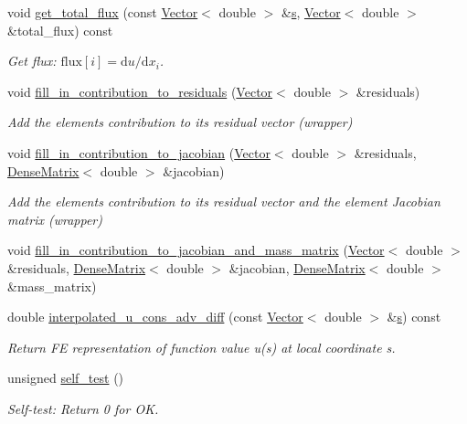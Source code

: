 \begin{DoxyCompactItemize}
void \hyperlink{classoomph_1_1GeneralisedAdvectionDiffusionEquations_a79bce0d40bdc46e998729332ceefb889}{get\+\_\+total\+\_\+flux} (const \hyperlink{classoomph_1_1Vector}{Vector}$<$ double $>$ \&\hyperlink{cfortran_8h_ab7123126e4885ef647dd9c6e3807a21c}{s}, \hyperlink{classoomph_1_1Vector}{Vector}$<$ double $>$ \&total\+\_\+flux) const
\begin{DoxyCompactList}\small\item\em Get flux\+: $\mbox{flux}[i] = \mbox{d}u / \mbox{d}x_i $. \end{DoxyCompactList}\item 
void \hyperlink{classoomph_1_1GeneralisedAdvectionDiffusionEquations_a322c49659ad14f656165f7e777d3368a}{fill\+\_\+in\+\_\+contribution\+\_\+to\+\_\+residuals} (\hyperlink{classoomph_1_1Vector}{Vector}$<$ double $>$ \&residuals)
\begin{DoxyCompactList}\small\item\em Add the element\textquotesingle{}s contribution to its residual vector (wrapper) \end{DoxyCompactList}\item 
void \hyperlink{classoomph_1_1GeneralisedAdvectionDiffusionEquations_a02fc6950a91d90a60b44e9e7a5e1db3f}{fill\+\_\+in\+\_\+contribution\+\_\+to\+\_\+jacobian} (\hyperlink{classoomph_1_1Vector}{Vector}$<$ double $>$ \&residuals, \hyperlink{classoomph_1_1DenseMatrix}{Dense\+Matrix}$<$ double $>$ \&jacobian)
\begin{DoxyCompactList}\small\item\em Add the element\textquotesingle{}s contribution to its residual vector and the element Jacobian matrix (wrapper) \end{DoxyCompactList}\item 
void \hyperlink{classoomph_1_1GeneralisedAdvectionDiffusionEquations_a773339fec529d9779bb88146a4e9c641}{fill\+\_\+in\+\_\+contribution\+\_\+to\+\_\+jacobian\+\_\+and\+\_\+mass\+\_\+matrix} (\hyperlink{classoomph_1_1Vector}{Vector}$<$ double $>$ \&residuals, \hyperlink{classoomph_1_1DenseMatrix}{Dense\+Matrix}$<$ double $>$ \&jacobian, \hyperlink{classoomph_1_1DenseMatrix}{Dense\+Matrix}$<$ double $>$ \&mass\+\_\+matrix)
\item 
double \hyperlink{classoomph_1_1GeneralisedAdvectionDiffusionEquations_af71ceecd19ee6ea4e8978b9441fb1d42}{interpolated\+\_\+u\+\_\+cons\+\_\+adv\+\_\+diff} (const \hyperlink{classoomph_1_1Vector}{Vector}$<$ double $>$ \&\hyperlink{cfortran_8h_ab7123126e4885ef647dd9c6e3807a21c}{s}) const
\begin{DoxyCompactList}\small\item\em Return FE representation of function value u(s) at local coordinate s. \end{DoxyCompactList}\item 
unsigned \hyperlink{classoomph_1_1GeneralisedAdvectionDiffusionEquations_a77d006ee2f3f4097ad74b180366ddc77}{self\+\_\+test} ()
\begin{DoxyCompactList}\small\item\em Self-\/test\+: Return 0 for OK. \end{DoxyCompactList}\end{DoxyCompactItemize}
